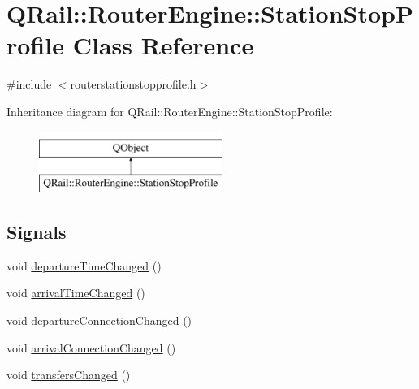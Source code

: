 \hypertarget{classQRail_1_1RouterEngine_1_1StationStopProfile}{}\section{Q\+Rail\+::Router\+Engine\+::Station\+Stop\+Profile Class Reference}
\label{classQRail_1_1RouterEngine_1_1StationStopProfile}


{\ttfamily \#include $<$routerstationstopprofile.\+h$>$}

Inheritance diagram for Q\+Rail\+::Router\+Engine\+::Station\+Stop\+Profile\+:\begin{figure}[H]
\begin{center}
\leavevmode
\includegraphics[height=2.000000cm]{classQRail_1_1RouterEngine_1_1StationStopProfile}
\end{center}
\end{figure}
\subsection*{Signals}
\begin{DoxyCompactItemize}
\item 
void \mbox{\hyperlink{classQRail_1_1RouterEngine_1_1StationStopProfile_a1028dba9cb5c7e49355508df15e33be5}{departure\+Time\+Changed}} ()
\item 
void \mbox{\hyperlink{classQRail_1_1RouterEngine_1_1StationStopProfile_a691947e7f6e977e3221e9183b6a54202}{arrival\+Time\+Changed}} ()
\item 
void \mbox{\hyperlink{classQRail_1_1RouterEngine_1_1StationStopProfile_a8f1943060a94c2d15f181312d3efb8b5}{departure\+Connection\+Changed}} ()
\item 
void \mbox{\hyperlink{classQRail_1_1RouterEngine_1_1StationStopProfile_a5af26da1d8cce37a0a6210772f285c94}{arrival\+Connection\+Changed}} ()
\item 
void \mbox{\hyperlink{classQRail_1_1RouterEngine_1_1StationStopProfile_a32fef2d12e32ac0c2d8f62d631cfd547}{transfers\+Changed}} ()
\end{DoxyCompactItemize}
